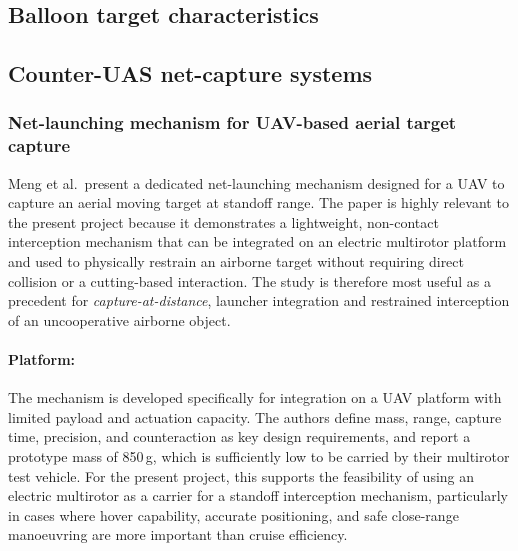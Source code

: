 


\subsection{Balloon target characteristics}









\subsection{Counter-UAS net-capture systems}


\subsubsection{Net-launching mechanism for UAV-based aerial target capture}
Meng et al.\ present a dedicated net-launching mechanism designed for a UAV to capture an aerial moving target at standoff range. The paper is highly relevant to the present project because it demonstrates a lightweight, non-contact interception mechanism that can be integrated on an electric multirotor platform and used to physically restrain an airborne target without requiring direct collision or a cutting-based interaction. The study is therefore most useful as a precedent for \emph{capture-at-distance}, launcher integration and restrained interception of an uncooperative airborne object. \cite{Meng2018NetLaunching}

\paragraph{Platform:} The mechanism is developed specifically for integration on a UAV platform with limited payload and actuation capacity. The authors define mass, range, capture time, precision, and counteraction as key design requirements, and report a prototype mass of 850\,g, which is sufficiently low to be carried by their multirotor test vehicle. For the present project, this supports the feasibility of using an electric multirotor as a carrier for a standoff interception mechanism, particularly in cases where hover capability, accurate positioning, and safe close-range manoeuvring are more important than cruise efficiency. \cite{Meng2018NetLaunching}


